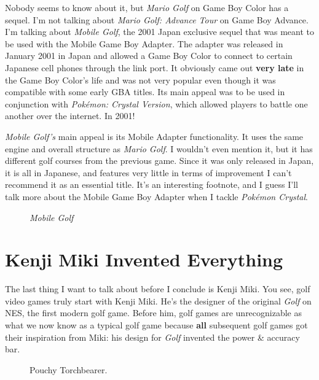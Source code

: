 \documentclass{book}
\begin{document}
Nobody seems to know about it, but \emph{Mario Golf} on Game Boy Color has a sequel. I’m not talking about \emph{Mario Golf: Advance Tour} on Game Boy Advance. I’m talking about \emph{Mobile Golf}, the 2001 Japan exclusive sequel that was meant to be used with the Mobile Game Boy Adapter. The adapter was released in January 2001 in Japan and allowed a Game Boy Color to connect to certain Japanese cell phones through the link port. It obviously came out \textbf{very late} in the Game Boy Color’s life and was not very popular even though it was compatible with some early GBA titles. Its main appeal was to be used in conjunction with \emph{Pokémon: Crystal Version}, which allowed players to battle one another over the internet. In 2001!\par
\emph{Mobile Golf’s} main appeal is its Mobile Adapter functionality. It uses the same engine and overall structure as \emph{Mario Golf}. I wouldn’t even mention it, but it has different golf courses from the previous game. Since it was only released in Japan, it is all in Japanese, and features very little in terms of improvement I can’t recommend it as an essential title. It’s an interesting footnote, and I guess I’ll talk more about the Mobile Game Boy Adapter when I tackle \emph{Pokémon Crystal}.\par
\FloatBarrier\vspace{\baselineskip}\begin{figure}[H]\caption*{\emph{Mobile Golf}}\end{figure}
\FloatBarrier\section*{Kenji Miki Invented Everything}
The last thing I want to talk about before I conclude is Kenji Miki. You see, golf video games truly start with Kenji Miki. He’s the designer of the original \emph{Golf} on NES, the first modern golf game. Before him, golf games are unrecognizable as what we now know as a typical golf game because \textbf{all} subsequent golf games got their inspiration from Miki: his design for \emph{Golf} invented the power \& accuracy bar.\par
\FloatBarrier\vspace{\baselineskip}\begin{figure}[H]\caption*{Pouchy Torchbearer.}\end{figure}
\end{document}
